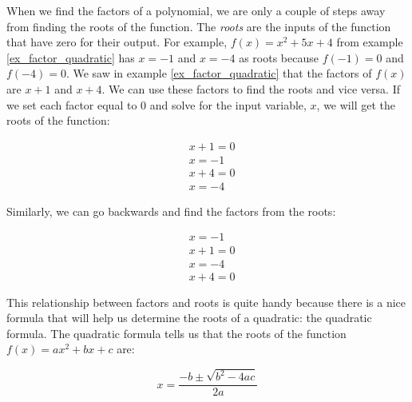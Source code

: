 When we find the factors of a polynomial, we are only a couple of steps away from finding the roots of the function. The \emph{roots} are the inputs of the function that have zero for their output. For example, $f(x)=x^2+5x+4$ from example \ref{ex_factor_quadratic} has $x=-1$ and $x=-4$ as roots because $f(-1)=0$ and $f(-4)=0$. We saw in example \ref{ex_factor_quadratic} that the factors of $f(x)$ are $x+1$ and $x+4$. We can use these factors to find the roots and vice versa. If we set each factor equal to 0 and solve for the input variable, $x$, we will get the roots of the function:
\begin{multicols}{2}
	\noindent
\begin{equation*}
	\begin{split}
		& x+1  =0 \\
		  & x  =-1
	\end{split}
\end{equation*}
\begin{equation*}
	\begin{split}
		& x+4  =0 \\
		  & x  =-4
	\end{split}
\end{equation*}
\end{multicols}

\noindent
Similarly, we can go backwards and find the factors from the roots:
\begin{multicols}{2}
	\noindent
\begin{equation*}
	\begin{split}
		& x  =-1 \\
		& x + 1 =0
	\end{split}
\end{equation*}
\begin{equation*}
	\begin{split}
		& x =-4 \\
		& x+4  =0
	\end{split}
\end{equation*}
\end{multicols}

This relationship between factors and roots is quite handy because there is a nice formula that will help us determine the roots of a quadratic: the quadratic formula. The quadratic formula tells us that the roots of the function $f(x) = ax^2 + bx +c$ are:

\begin{equation}\label{eqn:quadratic_formula}
	x = \frac{-b \pm \sqrt{b^2-4ac}}{2a}
\end{equation}

